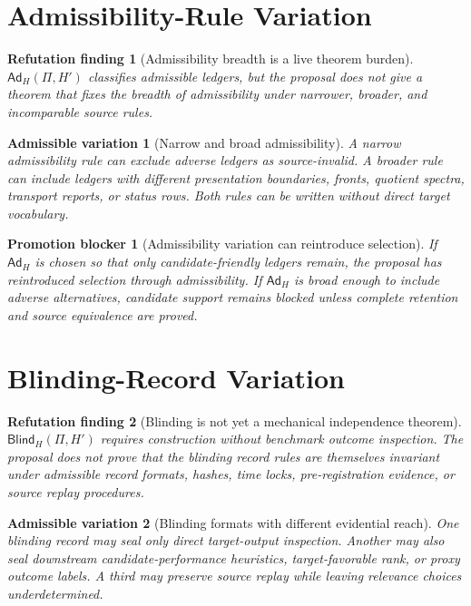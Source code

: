 \documentclass[11pt]{article}
\newcommand{\AdH}{\mathsf{Ad}_{H}}
\newcommand{\BlindH}{\mathsf{Blind}_{H}}
\newtheorem{finding}{Refutation finding}
\newtheorem{variation}{Admissible variation}
\newtheorem{blocker}{Promotion blocker}
\begin{document}
\section{Admissibility-Rule Variation}

\begin{finding}[Admissibility breadth is a live theorem burden]
\(\AdH(\Pi,H')\) classifies admissible ledgers, but the proposal does not
give a theorem that fixes the breadth of admissibility under narrower,
broader, and incomparable source rules.
\end{finding}

\begin{variation}[Narrow and broad admissibility]
A narrow admissibility rule can exclude adverse ledgers as source-invalid.
A broader rule can include ledgers with different presentation boundaries,
fronts, quotient spectra, transport reports, or status rows. Both rules can
be written without direct target vocabulary.
\end{variation}

\begin{blocker}[Admissibility variation can reintroduce selection]
If \(\AdH\) is chosen so that only candidate-friendly ledgers remain, the
proposal has reintroduced selection through admissibility. If \(\AdH\) is
broad enough to include adverse alternatives, candidate support remains
blocked unless complete retention and source equivalence are proved.
\end{blocker}

\section{Blinding-Record Variation}

\begin{finding}[Blinding is not yet a mechanical independence theorem]
\(\BlindH(\Pi,H')\) requires construction without benchmark outcome
inspection. The proposal does not prove that the blinding record rules are
themselves invariant under admissible record formats, hashes, time locks,
pre-registration evidence, or source replay procedures.
\end{finding}

\begin{variation}[Blinding formats with different evidential reach]
One blinding record may seal only direct target-output inspection. Another
may also seal downstream candidate-performance heuristics, target-favorable
rank, or proxy outcome labels. A third may preserve source replay while
leaving relevance choices underdetermined.
\end{variation}
\end{document}
